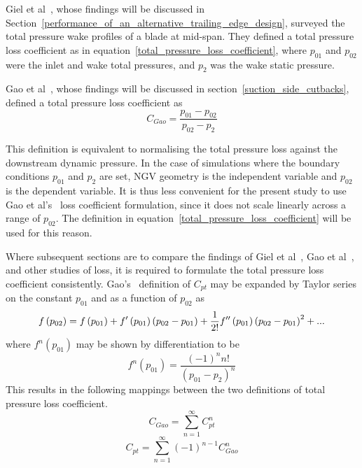 \documentclass[a4paper, 11pt, oneside]{report}
\begin{document}
Giel et al~\cite{giel_te_thickness}, whose findings will be discussed in Section~\ref{performance_of_an_alternative_trailing_edge_design}, surveyed the total pressure wake profiles of a blade at mid-span. They defined a total pressure loss coefficient as in equation~\ref{total_pressure_loss_coefficient}, where $p_{01}$ and $p_{02}$ were the inlet and wake total pressures, and $p_2$ was the wake static pressure. 

Gao et al~\cite{gao_te}, whose findings will be discussed in section~\ref{suction_side_cutbacks}, defined a total pressure loss coefficient as
\begin{equation}
C_{Gao} = \frac{
p_{01} - p_{02}
}{
p_{02} - p_2
}
\end{equation}

This definition is equivalent to normalising the total pressure loss against the downstream dynamic pressure. In the case of simulations where the boundary conditions $p_{01}$ and $p_2$ are set, NGV geometry is the independent variable and $p_{02}$ is the dependent variable. It is thus less convenient for the present study to use Gao et al's~\cite{gao_te} loss coefficient formulation, since it does not scale linearly across a range of $p_{02}$. The definition in equation~\ref{total_pressure_loss_coefficient} will be used for this reason.

Where subsequent sections are to compare the findings of Giel et al~\cite{giel_te_thickness}, Gao et al~\cite{gao_te}, and other studies of loss, it is required to formulate the total pressure loss coefficient consistently. Gao's~\cite{gao_te} definition of $C_{pt}$ may be expanded by Taylor series on the constant $p_{01}$ and as a function of $p_{02}$ as
\begin{equation}
f\left(p_{02}\right) = \\
f\left(p_{01}\right) +
f'\left(p_{01}\right) \left(p_{02} - p_{01}\right) +
\frac{1}{2!} f''\left(p_{01}\right) \left(p_{02} - p_{01}\right)^2 +
...
\end{equation}
where $f^n\left(p_{01}\right)$ may be shown by differentiation to be
\begin{equation}
f^n\left(p_{01}\right) =
\frac{
	\left(-1\right)^n n !
}{
	(p_{01} - p_2)^n
}
\end{equation}
This results in the following mappings between the two definitions of total pressure loss coefficient.
\begin{equation}
C_{Gao} = 
\sum_{n=1}^{\infty}
C_{pt}^n
\end{equation}
\begin{equation}
C_{pt} = 
\sum_{n=1}^{\infty}
\left(-1\right)^{n-1}
C_{Gao}^n
\end{equation}
\end{document}
